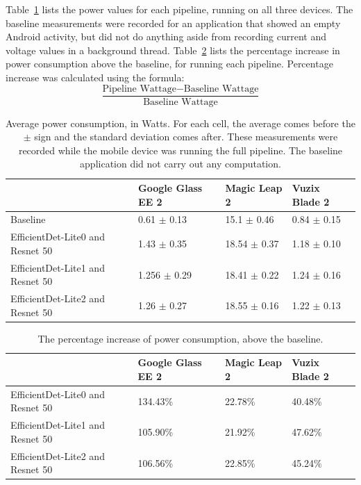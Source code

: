 Table~\ref{tab:mobile_power} lists the power values for each pipeline, running
on all three devices.
The baseline measurements were recorded for an application that showed an empty
Android activity, but did not do anything aside from recording current and
voltage values in a background thread.
Table~\ref{tab:mobile_power_pi} lists the percentage increase in power
consumption above the baseline, for running each pipeline.
Percentage increase was calculated using the formula:
\[
  \frac{\text{Pipeline Wattage} - \text{Baseline Wattage}}{
    \text{Baseline Wattage}}
\]

\begin{table}
\begin{tabular}{|l||l|l|l|}
  \hline
  & Google Glass EE 2 & Magic Leap 2 & Vuzix Blade 2\\
  \hline
  \hline
  Baseline & 0.61 $\pm$ 0.13 & 15.1 $\pm$ 0.46 & 0.84 $\pm$ 0.15\\
  EfficientDet-Lite0 and Resnet 50 & 1.43 $\pm$ 0.35 & 18.54 $\pm$ 0.37 & 1.18 $\pm$ 0.10\\
  EfficientDet-Lite1 and Resnet 50 & 1.256 $\pm$ 0.29 & 18.41 $\pm$ 0.22 & 1.24 $\pm$ 0.16\\
  EfficientDet-Lite2 and Resnet 50 & 1.26 $\pm$ 0.27 & 18.55 $\pm$ 0.16 & 1.22 $\pm$ 0.13\\
  \hline
\end{tabular}
  \caption{
    Average power consumption, in Watts.
    For each cell, the average comes before the $\pm$ sign and the standard
    deviation comes after.
    These measurements were recorded while the mobile device was running the
    full pipeline.
    The baseline application did not carry out any computation.
  }\label{tab:mobile_power}
\end{table}

\begin{table}
\begin{tabular}{|l||l|l|l|}
  \hline
  & Google Glass EE 2 & Magic Leap 2 & Vuzix Blade 2\\
  \hline
  \hline
  EfficientDet-Lite0 and Resnet 50 & 134.43\% & 22.78\%	& 40.48\%\\
  EfficientDet-Lite1 and Resnet 50 & 105.90\% & 21.92\% & 47.62\%\\
  EfficientDet-Lite2 and Resnet 50 & 106.56\% & 22.85\%	& 45.24\%\\
  \hline
\end{tabular}
  \caption{
    The percentage increase of power consumption, above the baseline.
  }\label{tab:mobile_power_pi}
\end{table}

